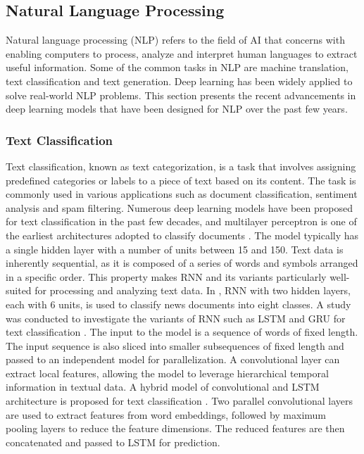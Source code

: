 \documentclass[preprint,12pt]{elsarticle}
\begin{document}
\subsection{Natural Language Processing}
Natural language processing (NLP) refers to the field of AI that concerns with enabling computers to process, analyze and interpret human languages to extract useful information. Some of the common tasks in NLP are machine translation, text classification and text generation. Deep learning has been widely applied to solve real-world NLP problems. This section presents the recent advancements in deep learning models that have been designed for NLP over the past few years.

\subsubsection{Text Classification}
Text classification, known as text categorization, is a task that involves assigning predefined categories or labels to a piece of text based on its content. The task is commonly used in various applications such as document classification, sentiment analysis and spam filtering. Numerous deep learning models have been proposed for text classification in the past few decades, and multilayer perceptron is one of the earliest architectures adopted to classify documents \citep{calvo_intelligent_2000, yu_latent_2008}. The model typically has a single hidden layer with a number of units between 15 and 150. Text data is inherently sequential, as it is composed of a series of words and symbols arranged in a specific order. This property makes RNN and its variants particularly well-suited for processing and analyzing text data. In \citep{arevian_recurrent_2007}, RNN with two hidden layers, each with 6 units, is used to classify news documents into eight classes. A study was conducted to investigate the variants of RNN such as LSTM and GRU for text classification \citep{huang_optimization_2020}. The input to the model is a sequence of words of fixed length. The input sequence is also sliced into smaller subsequences of fixed length and passed to an independent model for parallelization. A convolutional layer can extract local features, allowing the model to leverage hierarchical temporal information in textual data. A hybrid model of convolutional and LSTM architecture is proposed for text classification \citep{wang_convolutional_2019}. Two parallel convolutional layers are used to extract features from word embeddings, followed by maximum pooling layers to reduce the feature dimensions. The reduced features are then concatenated and passed to LSTM for prediction.
\end{document}
